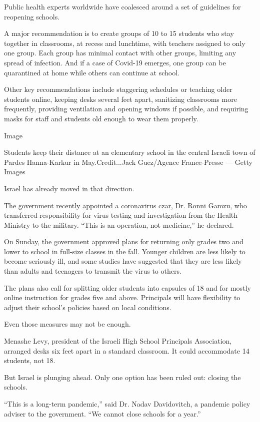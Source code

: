 Public health experts worldwide have coalesced around a set of
guidelines for reopening schools.

A major recommendation is to create groups of 10 to 15 students who stay
together in classrooms, at recess and lunchtime, with teachers assigned
to only one group. Each group has minimal contact with other groups,
limiting any spread of infection. And if a case of Covid-19 emerges, one
group can be quarantined at home while others can continue at school.

Other key recommendations include staggering schedules or teaching older
students online, keeping desks several feet apart, sanitizing classrooms
more frequently, providing ventilation and opening windows if possible,
and requiring masks for staff and students old enough to wear them
properly.

Image

Students keep their distance at an elementary school in the central
Israeli town of Pardes Hanna-Karkur in May.Credit...Jack Guez/Agence
France-Presse --- Getty Images

Israel has already moved in that direction.

The government recently appointed a coronavirus czar, Dr. Ronni Gamzu,
who transferred responsibility for virus testing and investigation from
the Health Ministry to the military. ``This is an operation, not
medicine,'' he declared.

On Sunday, the government approved plans for returning only grades two
and lower to school in full-size classes in the fall. Younger children
are less likely to become seriously ill, and some studies have suggested
that they are less likely than adults and teenagers to transmit the
virus to others.

The plans also call for splitting older students into capsules of 18 and
for mostly online instruction for grades five and above. Principals will
have flexibility to adjust their school's policies based on local
conditions.

Even those measures may not be enough.

Menashe Levy, president of the Israeli High School Principals
Association, arranged desks six feet apart in a standard classroom. It
could accommodate 14 students, not 18.

But Israel is plunging ahead. Only one option has been ruled out:
closing the schools.

``This is a long-term pandemic,'' said Dr. Nadav Davidovitch, a pandemic
policy adviser to the government. ``We cannot close schools for a
year.''

